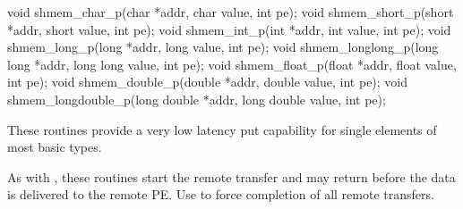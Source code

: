 \synC 
void shmem_char_p(char *addr, char value, int pe);
void shmem_short_p(short *addr, short value, int pe);
void shmem_int_p(int *addr, int value, int pe);
void shmem_long_p(long *addr, long value, int pe);
void shmem_longlong_p(long long *addr, long long value, int pe);
void shmem_float_p(float *addr, float value, int pe);
void shmem_double_p(double *addr, double value, int pe);
void shmem_longdouble_p(long double *addr, long double value, int pe); %

{     These routines provide a very low latency put capability for single
       elements of most basic types.

       As with , these routines start the remote transfer and may
       return	before the   data  is delivered  to the  remote \ac{PE}.  Use
        to force completion of all remote \PUT{} transfers.
}
{
}
\eAPI
